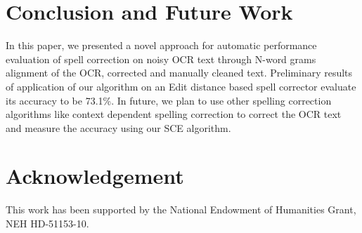 \documentclass[preprint,11pt]{elsarticle}
\begin{document}
\section{Conclusion and Future Work}
\label{spell:fw}
In this paper, we presented a novel approach for automatic performance evaluation of spell correction on noisy OCR text through N-word grams alignment of the OCR, corrected and manually cleaned text. Preliminary results of application of our algorithm on an Edit distance based spell corrector evaluate its accuracy to be 73.1\%. %
In future, we plan to use other spelling correction algorithms like context dependent spelling correction to correct the OCR text and measure the accuracy using our SCE algorithm. 


\section{Acknowledgement}
This work has been supported by the National Endowment of Humanities Grant, NEH HD-51153-10.






   
 





\end{document}
